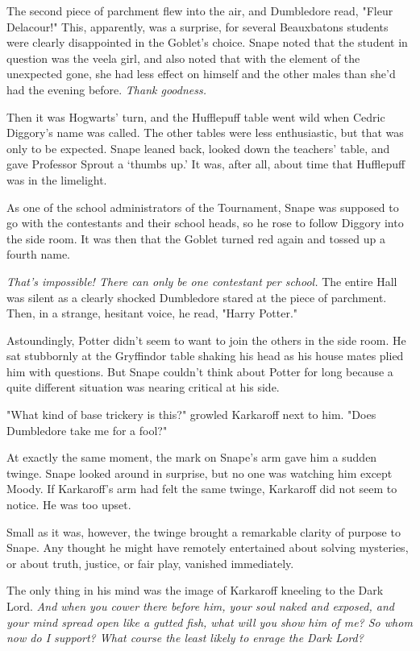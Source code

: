 The second piece of parchment flew into the air, and Dumbledore read, "Fleur Delacour!" This, apparently, was a surprise, for several Beauxbatons students were clearly disappointed in the Goblet's choice. Snape noted that the student in question was the veela girl, and also noted that with the element of the unexpected gone, she had less effect on himself and the other males than she'd had the evening before. \emph{Thank goodness.}

Then it was Hogwarts' turn, and the Hufflepuff table went wild when Cedric Diggory's name was called. The other tables were less enthusiastic, but that was only to be expected. Snape leaned back, looked down the teachers' table, and gave Professor Sprout a `thumbs up.' It was, after all, about time that Hufflepuff was in the limelight.

As one of the school administrators of the Tournament, Snape was supposed to go with the contestants and their school heads, so he rose to follow Diggory into the side room. It was then that the Goblet turned red again and tossed up a fourth name.

\emph{That's impossible! There can only be one contestant per school.} The entire Hall was silent as a clearly shocked Dumbledore stared at the piece of parchment. Then, in a strange, hesitant voice, he read, "Harry Potter."

Astoundingly, Potter didn't seem to want to join the others in the side room. He sat stubbornly at the Gryffindor table shaking his head as his house mates plied him with questions. But Snape couldn't think about Potter for long because a quite different situation was nearing critical at his side.

"What kind of base trickery is this?" growled Karkaroff next to him. "Does Dumbledore take me for a fool?"

At exactly the same moment, the mark on Snape's arm gave him a sudden twinge. Snape looked around in surprise, but no one was watching him except Moody. If Karkaroff's arm had felt the same twinge, Karkaroff did not seem to notice. He was too upset.

Small as it was, however, the twinge brought a remarkable clarity of purpose to Snape. Any thought he might have remotely entertained about solving mysteries, or about truth, justice, or fair play, vanished immediately.

The only thing in his mind was the image of Karkaroff kneeling to the Dark Lord. \emph{And when you cower there before him, your soul naked and exposed, and your mind spread open like a gutted fish, what will you show him of me? So whom now do I support? What course the least likely to enrage the Dark Lord?}

